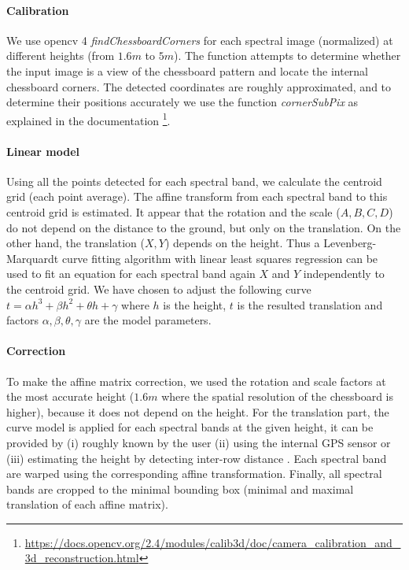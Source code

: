 \documentclass[]{elsarticle}
\begin{document}
	\paragraph{Calibration}
	We use opencv 4 \textit{findChessboardCorners} for each spectral image (normalized) at different heights (from $1.6m$ to $5m$).
	The function attempts to determine whether the input image is a view of the chessboard pattern and locate the internal chessboard corners.
	The detected coordinates are roughly approximated, and to determine their positions accurately we use the function \textit{cornerSubPix}  as explained in the documentation \footnote{\url{https://docs.opencv.org/2.4/modules/calib3d/doc/camera_calibration_and_3d_reconstruction.html}}.
	
	\paragraph{Linear model}
	
	Using all the points detected for each spectral band, we calculate the centroid grid (each point average).
	The affine transform from each spectral band to this centroid grid is estimated.
	It appear that the rotation and the scale ($A,B,C,D$) do not depend on the distance to the ground, but only on the translation.
	On the other hand, the translation ($X,Y$) depends on the height.
	Thus a Levenberg-Marquardt curve fitting algorithm with linear least squares regression \cite{More78}
	can be used to fit an equation for each spectral band again $X$ and $Y$ independently to the centroid grid.
	We have chosen to adjust the following curve $t = \alpha h^3 + \beta h^2 + \theta h + \gamma$ where $h$ is the height,
	$t$ is the resulted translation and factors $\alpha,\beta,\theta,\gamma$ are the model parameters.
	
	\paragraph{Correction}
	
	To make the affine matrix correction, we used the rotation and scale factors at the most accurate height
	($1.6m$ where the spatial resolution of the chessboard is higher), because it does not depend on the height.
	For the translation part, the curve model is applied for each spectral bands at the given height,
	it can be provided by
		(i) roughly known by the user
		(ii) using the internal GPS sensor or
		(iii) estimating the height by detecting inter-row distance \cite{Bossu2007SegmentationDP}.
	Each spectral band are warped using the corresponding affine transformation.
	Finally, all spectral bands are cropped to the minimal bounding box (minimal and maximal translation of each affine matrix).
	
\end{document}
